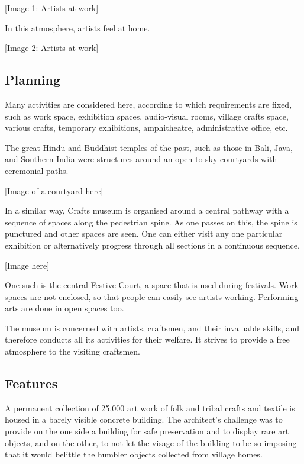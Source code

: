 [Image 1: Artists at work]

In this atmosphere, artists feel at home.

[Image 2: Artists at work]


\subsection{Planning} %
\label{sub:ce_planning}

Many activities are considered here, according to which requirements are fixed, such as work space, exhibition spaces, audio-visual rooms, village crafts space, various crafts, temporary exhibitions, amphitheatre, administrative office, etc.

The great Hindu and Buddhist temples of the past, such as those in Bali, Java, and Southern India were structures around an open-to-sky courtyards with ceremonial paths.

[Image of a courtyard here]

In a similar way, Crafts museum is organised around a central pathway with a sequence of spaces along the pedestrian spine. As one passes on this, the spine is punctured and other spaces are seen. One can either visit any one particular exhibition or alternatively progress through all sections in a continuous sequence.

[Image here]

One such is the central Festive Court, a space that is used during festivals. Work spaces are not enclosed, so that people can easily see artists working. Performing arts are done in open spaces too.

The museum is concerned with artists, craftsmen, and their invaluable skills, and therefore conducts all its activities for their welfare. It strives to provide a free atmosphere to the visiting craftsmen.


\subsection{Features} %
\label{sub:ce_feat}


A permanent collection of 25,000 art work of folk and tribal crafts and textile is housed in a barely visible concrete building. The architect's challenge was to provide on the one side a building for safe preservation and to display rare art objects, and on the other, to not let the visage of the building to be so imposing that it would belittle the humbler objects collected from village homes.

